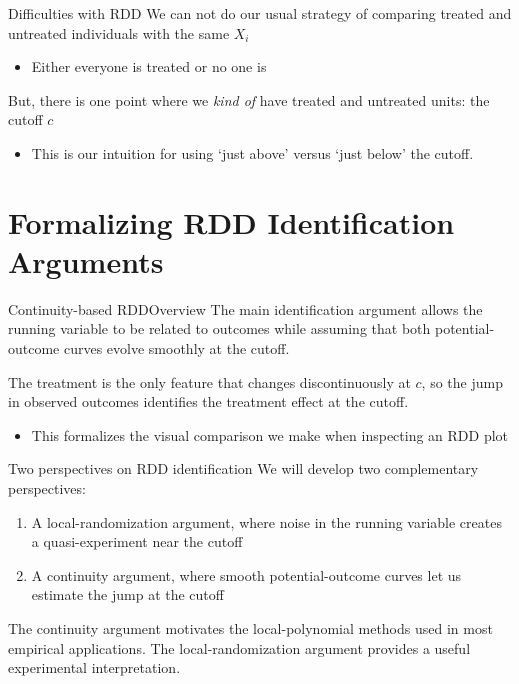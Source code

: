\documentclass[aspectratio=169,t,11pt,table]{beamer}
\begin{document}
\begin{frame}{Difficulties with RDD}
  We can not do our usual strategy of comparing treated and untreated individuals with the same $X_i$
  \begin{itemize}
    \item Either everyone is treated or no one is
  \end{itemize}

  \bigskip
  But, there is one point where we \emph{kind of} have treated and untreated units: the cutoff $c$
  \begin{itemize}
    \item This is our intuition for using `just above' versus `just below' the cutoff.
  \end{itemize}
\end{frame}

\section{Formalizing RDD Identification Arguments}

\begin{frame}{Continuity-based RDD}{Overview}
  The main identification argument allows the running variable to be related to outcomes while assuming that both potential-outcome curves evolve smoothly at the cutoff.

  \bigskip
  The treatment is the only feature that changes discontinuously at $c$, so the jump in observed outcomes identifies the treatment effect at the cutoff.
  \begin{itemize}
    \item This formalizes the visual comparison we make when inspecting an RDD plot
  \end{itemize}
\end{frame}

\begin{frame}{Two perspectives on RDD identification}
  We will develop two complementary perspectives:
  \begin{enumerate}
    \item A local-randomization argument, where noise in the running variable creates a quasi-experiment near the cutoff
    \item A continuity argument, where smooth potential-outcome curves let us estimate the jump at the cutoff
  \end{enumerate}

  \bigskip
  The continuity argument motivates the local-polynomial methods used in most empirical applications. The local-randomization argument provides a useful experimental interpretation.
\end{frame}
\end{document}
